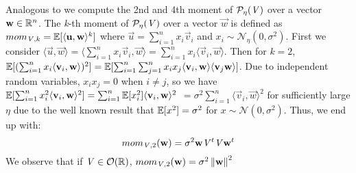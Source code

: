 Analogous to \cite{NR09} we compute the 2nd and 4th moment of $\PP[\eta]{V}$ over a vector $\vec{w} \in \bb{R}^n$.
The \textit{k}-th moment of $\PP[\eta]{V}$ over a vector $\vec{w}$ is defined as $mom_{\mat{V}, k} = \bb{E}[\langle \vec{u}, \vec{w} \rangle ^k]$ where $\vec{u} = \sum_{i=1}^{n} x_i \vec{v}_i$ and $x_i \sim \mathcal{N}_{\eta}(0, \sigma^2)$.
First we consider $\langle \vec{u}, \vec{w} \rangle = \langle \sum_{i=1}^{n} x_i\vec{v}_i, \vec{w}\rangle = \sum_{i=1}^{n}x_i \langle\vec{v}_i, \vec{w} \rangle$.
Then for $k=2$, $\bb{E}[(\sum_{i=1}^{n}x_i \langle\vec{v}_i, \vec{w} \rangle)^2] = \bb{E}[\sum_{i=1}^{n} \sum_{j=1}^{n} x_i x_j \langle \vec{v}_i, \vec{w} \rangle \langle \vec{v}_j \vec{w} \rangle]$.
Due to independent random variables, $x_i x_j = 0$ when $i \neq j$, so we have $\bb{E}[\sum_{i=1}^{n}x_i ^2 \langle \vec{v}_i, \vec{w} \rangle ^2] = \sum_{i=1}^{n}\bb{E}[x_i^2]\langle \vec{v}_i, \vec{w} \rangle^2$ 
$= \sigma^2 \sum_{i=1}^{n}\langle \vec{v}_i, \vec{w} \rangle^2$ for sufficiently large $\eta$ due to the well known result that $\bb{E}[x^2] = \sigma^2$ for $x \sim \mathcal{N}(0, \sigma^2)$.
Thus, we end up with:
\begin{equation}
mom_{\mat{V}, 2}(\vec{w}) = \sigma^2 \vec{w}\mat{V}^t\mat{V}\vec{w}^t \\
\end{equation}
We observe that if $\mat{V} \in \mathcal{O}(\bb{R})$, $mom_{\mat{V}, 2}(\vec{w}) = \sigma^2 \left \Vert \vec{w} \right \Vert^2$


